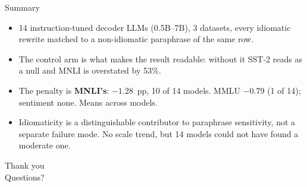 \documentclass[10pt]{beamer}
\begin{document}
\begin{frame}{Summary}
  \begin{itemize}
    \item 14 instruction-tuned decoder LLMs (0.5B--7B), 3 datasets, every
      idiomatic rewrite matched to a non-idiomatic paraphrase of the same row.
    \item The control arm is what makes the result readable: without it SST-2
      reads as a null and MNLI is overstated by 53\%.
    \item The penalty is \textbf{MNLI's}: $-1.28$~pp, 10 of 14 models. MMLU
      $-0.79$ (1 of 14); sentiment none. Means across models.
    \item Idiomaticity is a distinguishable contributor to paraphrase
      sensitivity, not a separate failure mode. No scale trend, but 14 models
      could not have found a moderate one.
  \end{itemize}
\end{frame}

\begin{frame}
  \centering
  \Huge Thank you\\[0.5em]
  \Large Questions?
\end{frame}
\end{document}
